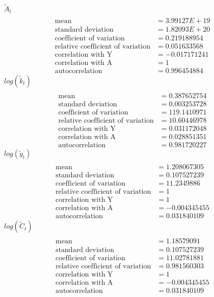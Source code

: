 \documentclass[letterpaper,12pt]{article}
\theoremstyle{definition}
\begin{document}
$\tilde{A}_t$
\begin{align*}
\\\text{mean} &= 3.99127E+19
\\\text{standard deviation} &=	1.82093E+20
\\\text{coefficient of variation}&=0.219188954
\\\text{relative coefficient of variation}&= 0.051633568
\\\text{correlation with Y}&=-0.017171241
\\\text{correlation with A}&=1	
\\\text{autocorrelation}&=0.996454884
\end{align*}
$log(\tilde{k}_t)$
\begin{align*}
\\\text{mean} &= 0.387652754
\\\text{standard deviation} &= 0.003253728
\\\text{coefficient of variation}&=119.1410971
\\\text{relative coefficient of variation}&=10.60446978
\\\text{correlation with Y}&=0.031172048
\\\text{correlation with A}&=0.028851351
\\\text{autocorrelation}&=0.981720227
\end{align*}
$log(\tilde{y}_t)$
\begin{align*}
\\\text{mean} &= 1.208067305
\\\text{standard deviation} &= 0.107527239
\\\text{coefficient of variation}&=11.2349886
\\\text{relative coefficient of variation}&=1
\\\text{correlation with Y}&=1
\\\text{correlation with A}&=-0.004345455
\\\text{autocorrelation}&=0.031840109
\end{align*}
$log(\tilde{C}_t)$
\begin{align*}
\\\text{mean} &= 1.18579091
\\\text{standard deviation} &= 0.107527239
\\\text{coefficient of variation}&=11.02781881
\\\text{relative coefficient of variation}&=0.981560303
\\\text{correlation with Y}&=1
\\\text{correlation with A}&=-0.004345455
\\\text{autocorrelation}&=0.031840109
\end{align*}
\end{document}
